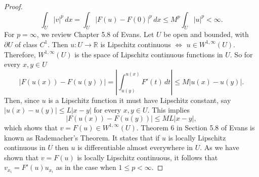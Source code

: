 \documentclass{article}
\begin{document}
\begin{flushleft}
\begin{proof}
$$\int_U |v|^p\,dx = \int_U \left|F(u)-F(0)\right|^p\,dx \le M^p \int_U |u|^p < \infty.$$
For $p=\infty$, we review Chapter 5.8 of Evans. Let $U$ be open and bounded, with $\partial U$ of class $C^1$. Then $u: U\to \mathbb{R}$ is Lipschitz continuous $\iff$ $u\in W^{1,\infty}(U)$. Therefore, $W^{1,\infty}(U)$ is the space of Lipschitz continuous functions in $U$. So for every $x,y\in U$
$$ \left|F(u(x))-F(u(y))\right|= \left|\int_{u(y)}^{u(x)}F'(t)\,dt \right|\le M |u(x)-u(y)|.$$
Then, since $u$ is a Lipschitz function it must have Lipschitz constant, say $|u(x)-u(y)| \le L |x-y|$ for every $x,y\in U$. This implies
$$ \left|F(u(x))-F(u(y))\right| \le ML  |x-y|,$$
which shows that $v=F(u)\in W^{1,\infty}(U)$. Theorem 6 in Section 5.8 of Evans is known as Rademacher's Theorem. It states that if $u$ is locally Lipschitz continuous in $U$ then $u$ is differentiable almost everywhere in $U$. As we have shown that $v=F(u)$ is locally Lipschitz continuous, it follows that $v_{x_i}=F'(u)u_{x_i}$ as in the case when $1\le p < \infty$.

\end{proof}

\end{flushleft}
\end{document}
